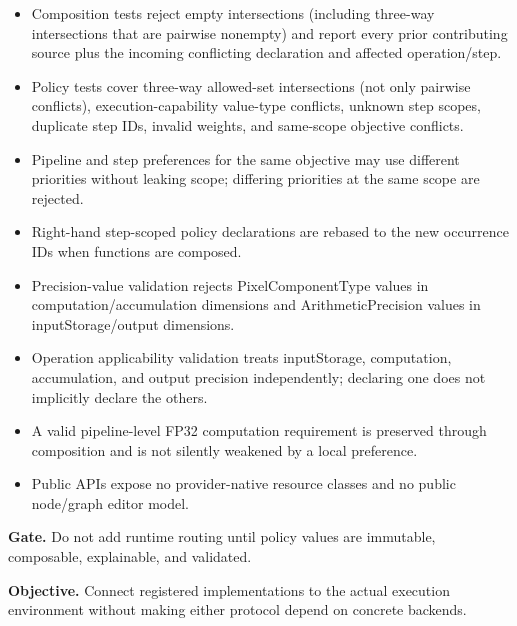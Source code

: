 \begin{itemize}
  \item Composition tests reject empty intersections (including three-way intersections that are pairwise nonempty) and report every prior contributing source plus the incoming conflicting declaration and affected operation/step.
  \item Policy tests cover three-way allowed-set intersections (not only pairwise conflicts), execution-capability value-type conflicts, unknown step scopes, duplicate step IDs, invalid weights, and same-scope objective conflicts.
  \item Pipeline and step preferences for the same objective may use different priorities without leaking scope; differing priorities at the same scope are rejected.
  \item Right-hand step-scoped policy declarations are rebased to the new occurrence IDs when functions are composed.
  \item Precision-value validation rejects PixelComponentType values in computation/accumulation dimensions and ArithmeticPrecision values in inputStorage/output dimensions.
  \item Operation applicability validation treats inputStorage, computation, accumulation, and output precision independently; declaring one does not implicitly declare the others.
  \item A valid pipeline-level FP32 computation requirement is preserved through composition and is not silently weakened by a local preference.
  \item Public APIs expose no provider-native resource classes and no public node/graph editor model.
\end{itemize}

\textbf{Gate.} Do not add runtime routing until policy values are immutable, composable, explainable, and validated.


\textbf{Objective.} Connect registered implementations to the actual execution environment without making either protocol depend on concrete backends.

